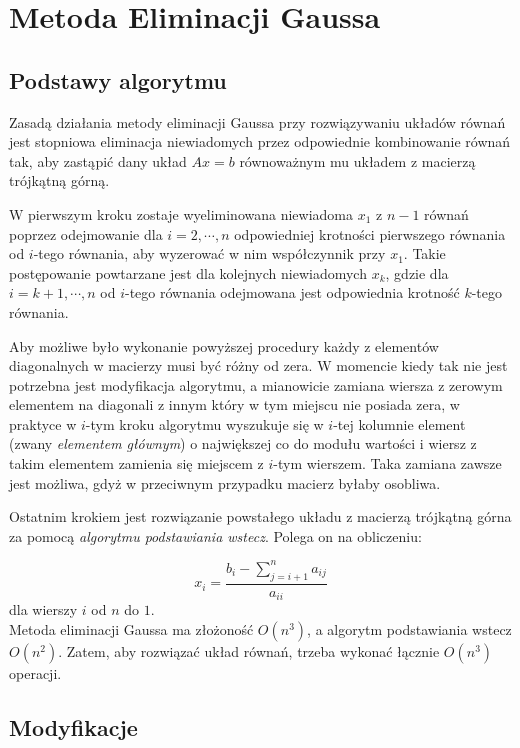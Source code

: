 \documentclass[12pt]{article}
\begin{document}
\section{Metoda Eliminacji Gaussa}

\subsection{Podstawy algorytmu}

Zasadą działania metody eliminacji Gaussa przy rozwiązywaniu układów równań jest stopniowa eliminacja niewiadomych przez odpowiednie kombinowanie równań tak, aby zastąpić dany układ $Ax = b$ równoważnym mu układem z macierzą trójkątną górną. 

W pierwszym kroku zostaje wyeliminowana niewiadoma $x_{1}$ z $n-1$ równań poprzez odejmowanie dla $i = 2, \cdots, n$ odpowiedniej krotności pierwszego równania od $i$-tego równania, aby wyzerować w nim współczynnik przy $x_{1}$. Takie postępowanie powtarzane jest dla kolejnych niewiadomych $x_{k}$, gdzie dla $i = k+1, \cdots, n$ od $i$-tego równania odejmowana jest odpowiednia krotność $k$-tego równania. 

Aby możliwe było wykonanie powyższej procedury każdy z elementów diagonalnych w macierzy musi być różny od zera. W momencie kiedy tak nie jest potrzebna jest modyfikacja algorytmu, a mianowicie zamiana wiersza z zerowym elementem na diagonali z innym który w tym miejscu nie posiada zera, w praktyce w $i$-tym kroku algorytmu wyszukuje się w $i$-tej kolumnie element (zwany \emph{elementem głównym}) o największej co do modułu wartości i wiersz z takim elementem zamienia się miejscem z $i$-tym wierszem. Taka zamiana zawsze jest możliwa, gdyż w przeciwnym przypadku macierz byłaby osobliwa. 

Ostatnim krokiem jest rozwiązanie powstałego układu z macierzą trójkątną górna za pomocą \emph{algorytmu podstawiania wstecz}. Polega on na obliczeniu:

\begin{equation*}
x_i = \frac{b_i - \sum_{j = i+1}^n a_{ij}}{a_{ii}}
\end{equation*}
dla wierszy $i$ od $n$ do $1$.  \\

Metoda eliminacji Gaussa ma złożoność $O(n^3)$, a algorytm podstawiania wstecz $O(n^2)$. Zatem, aby rozwiązać układ równań, trzeba wykonać łącznie $O(n^3)$ operacji.

\subsection{Modyfikacje}
\end{document}
